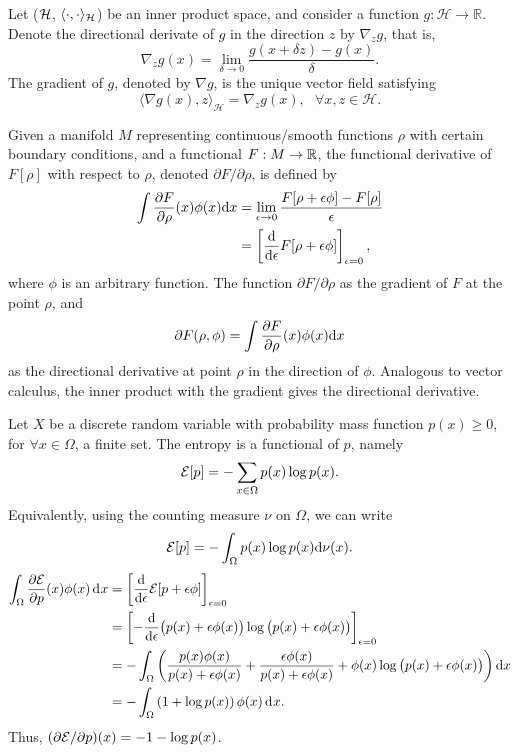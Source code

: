 \begin{definition}
  Let (${\mathcal H}$, $\langle\cdot,\cdot\rangle_{\mathcal H}$) be an inner product space, and consider a function $g:\mathcal H \rightarrow \mathbb R$. 
  Denote the directional derivate of $g$ in the direction $z$ by $\nabla_z g$, that is, 
	\[
		\nabla_z g(x) = \lim_{\delta \rightarrow 0} \frac{g(x + \delta z) - g(x)}{\delta}.
	\]
	The gradient of $g$, denoted by $\nabla g$, is the unique vector field satisfying 
	\[
		\langle \nabla g(x), z \rangle_{\mathcal H} = \nabla_z g(x), \ \ \ \forall x,z \in \mathcal H.
	\]
\end{definition}

\begin{definition}
  Given a manifold $M$ representing continuous/smooth functions $\rho$ with certain boundary conditions, and a functional $F:M\to\mathbb{R}$, the functional derivative of $F[\rho]$ with respect to $\rho$, denoted $\partial F/\partial\rho$, is defined by
  \begin{align*}
    \int \frac{\partial F}{\partial\rho}(x)\phi(x)\text{d} x
    &= \lim_{\epsilon\to 0} \frac{F[\rho + \epsilon\phi] - F[\rho]}{\epsilon} \\
    &= \left[ \frac{\text{d}}{\text{d} \epsilon} F[\rho + \epsilon\phi] \right]_{\epsilon=0},
  \end{align*}
  where $\phi$ is an arbitrary function.
  The function $\partial F/\partial\rho$ as the gradient of $F$ at the point $\rho$, and
  \[
    \partial F(\rho,\phi) = \int \frac{\partial F}{\partial\rho}(x)\phi(x) \text{d} x
  \]
  as the directional derivative at point $\rho$ in the direction of $\phi$.
  Analogous to vector calculus, the inner product with the gradient gives the directional derivative.
\end{definition}

\begin{example}
  Let $X$ be a discrete random variable with probability mass function $p(x) \geq 0$, for $\forall x \in \Omega$, a finite set.
  The entropy is a functional of $p$, namely
  \[
    {\mathcal E}[p] = - \sum_{x\in\Omega} p(x)\log p(x).
  \]
  Equivalently, using the counting measure $\nu$ on $\Omega$, we can write
  \[
    {\mathcal E}[p] = -\int_\Omega p(x) \log p(x) \text{d}\nu(x).
  \]
  \begin{align*}
    \int_\Omega \frac{\partial{\mathcal E}}{\partial p}(x)\phi(x) \operatorname{d}\hspace{0.5pt}\! x
    &= \left[ \frac{\text{d}}{\text{d} \epsilon} {\mathcal E}[p +  \epsilon\phi] \right]_{\epsilon=0} \\
    &= \left[ -\frac{\text{d}}{\text{d} \epsilon} 
    \big( p(x) + \epsilon\phi(x) \big) 
    \log \big(p(x) + \epsilon\phi(x) \big) 
    \right]_{\epsilon=0} \\
    &= -\int_\Omega \left( 
    \frac{p(x)\phi(x)}{p(x)+\epsilon\phi(x)}
    + \frac{\epsilon\phi(x)}{p(x) + \epsilon\phi(x)}
    + \phi(x)\log\big( p(x) + \epsilon\phi(x) \big)
    \right) \text{d} x \\
    &= -\int_\Omega \left( 1 + \log p(x) \right) \phi(x) \operatorname{d}\hspace{0.5pt}\! x.
  \end{align*}
  Thus, $(\partial{\mathcal E}/\partial p)(x) = -1 -\log p(x)$.
\end{example}


